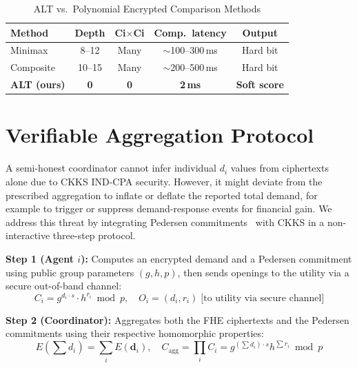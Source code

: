 \documentclass[conference]{IEEEtran}
\begin{document}
\begin{table}[!t]
\centering
\caption{ALT vs.\ Polynomial Encrypted Comparison Methods}
\label{tab:alt_comparison}
\footnotesize
\begin{tabular}{@{}lcccc@{}}
\toprule
\textbf{Method} & \textbf{Depth} & \textbf{Ci$\times$Ci} & \textbf{Comp.\ latency} & \textbf{Output} \\
\midrule
Minimax~\cite{Kim2018comparison} & 8--12 & Many & $\sim$100--300\,ms & Hard bit \\
Composite~\cite{Cheon2019comparison} & 10--15 & Many & $\sim$200--500\,ms & Hard bit \\
\textbf{ALT (ours)} & \textbf{0} & \textbf{0} & \textbf{2\,ms} & \textbf{Soft score} \\
\bottomrule
\end{tabular}
\end{table}

\section{Verifiable Aggregation Protocol}
\label{sec:verification}

A semi-honest coordinator cannot infer individual $d_i$ values from ciphertexts alone due to CKKS IND-CPA security. However, it might deviate from the prescribed aggregation to inflate or deflate the reported total demand, for example to trigger or suppress demand-response events for financial gain. We address this threat by integrating Pedersen commitments~\cite{Pedersen1991} with CKKS in a non-interactive three-step protocol.

\textbf{Step 1 (Agent $i$):} Computes an encrypted demand and a Pedersen commitment using public group parameters $(g, h, p)$, then sends openings to the utility via a secure out-of-band channel:
\begin{equation}
    C_i = g^{d_i \cdot s} \cdot h^{r_i} \bmod p, \quad O_i = (d_i, r_i) \;\text{[to utility via secure channel]}
\end{equation}

\textbf{Step 2 (Coordinator):} Aggregates both the FHE ciphertexts and the Pedersen commitments using their respective homomorphic properties:
\begin{equation}
    E\!\left(\textstyle\sum d_i\right) = \sum_{i} E(\mathbf{d}_i), \quad C_\text{agg} = \prod_{i} C_i = g^{(\sum d_i)\cdot s} h^{\sum r_i} \!\bmod p
\end{equation}
\end{document}
